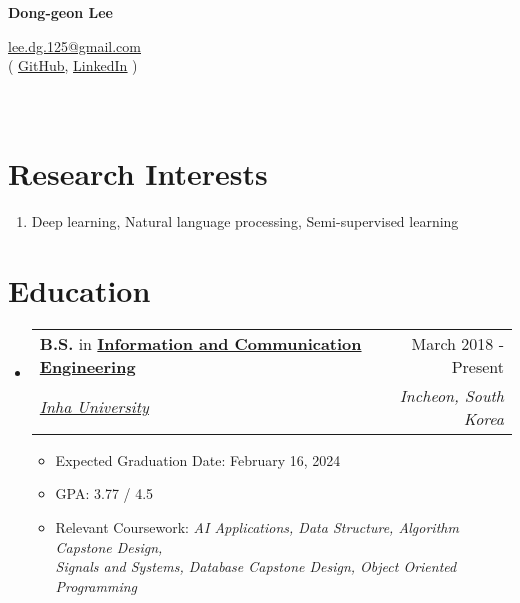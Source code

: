 \documentclass[letterpaper,11pt]{article}
\makeatletter
\newcommand{\resumeSubheading}[4]{
  \vspace{-1pt}\item
    \begin{tabular*}{0.97\textwidth}{l@{\extracolsep{\fill}}r}
      #1 & #2 \\
      \textit{\small#3} & \textit{\small #4} \\
    \end{tabular*}\vspace{-5pt}
}
\makeatother
\begin{document}
    \pagestyle{fancy}
    \thispagestyle{fancy}
    
    \begin{center}
        {\LARGE{\bf{Dong-geon Lee}}\\}
    \end{center}
    
    \vspace{-14pt}
    
    \begin{center} 
        {\href{mailto:lee.dg.125@gmail.com}{lee.dg.125@gmail.com} \\}
        {
            ( \underline{\href{https://github.com/oneonlee}{GitHub}}, 
            \underline{\href{https://www.linkedin.com/in/dong-geon-lee/}{LinkedIn}} )
        }
    \end{center}

    \section{\\Research Interests}
    \begin{enumerate}[noitemsep, leftmargin=*,label={}]
    \item{ Deep learning, Natural language processing, Semi-supervised learning}
    \end{enumerate}
    
    \section{Education}
    \begin{itemize}[leftmargin=*,label=]
        \resumeSubheading
        {\textbf{B.S.} in \textbf{\href{http://bit.ly/3Uu4LTi}{Information and Communication Engineering}}}{March 2018 - Present}{\href{https://eng.inha.ac.kr/eng/index.do}{Inha University}}{Incheon, South Korea}
            \begin{itemize}[label=\bullet]
                \item{Expected Graduation Date: February 16, 2024}
                \item{GPA: 3.77 / 4.5}
                \item{Relevant Coursework: \textit{AI Applications, Data Structure, Algorithm Capstone Design, \\ Signals and Systems, Database Capstone Design, Object Oriented Programming}}
            \end{itemize}
    \end{itemize}
    
\end{document}
